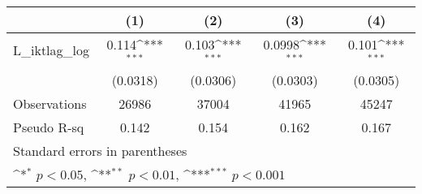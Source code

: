 {
\def\sym#1{\ifmmode^{#1}\else\(^{#1}\)\fi}
\begin{tabular}{l*{4}{c}}
\hline\hline
                &\multicolumn{1}{c}{(1)}         &\multicolumn{1}{c}{(2)}         &\multicolumn{1}{c}{(3)}         &\multicolumn{1}{c}{(4)}         \\
\hline
L\_iktlag\_log    &    0.114\sym{***}&    0.103\sym{***}&   0.0998\sym{***}&    0.101\sym{***}\\
                & (0.0318)         & (0.0306)         & (0.0303)         & (0.0305)         \\
\hline
Observations    &    26986         &    37004         &    41965         &    45247         \\
Pseudo R-sq     &    0.142         &    0.154         &    0.162         &    0.167         \\
\hline\hline
\multicolumn{5}{l}{\footnotesize Standard errors in parentheses}\\
\multicolumn{5}{l}{\footnotesize \sym{*} \(p<0.05\), \sym{**} \(p<0.01\), \sym{***} \(p<0.001\)}\\
\end{tabular}
}
